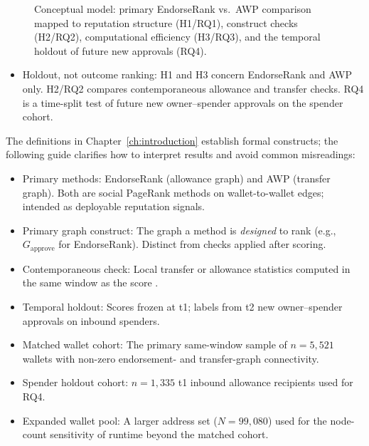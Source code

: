 \begin{figure}[htbp]
\centering

\caption{Conceptual model: primary EndorseRank vs.\ AWP comparison mapped to reputation structure (H1/RQ1), construct checks (H2/RQ2), computational efficiency (H3/RQ3), and the temporal holdout of future new approvals (RQ4).}
\label{fig:conceptual-model}
\end{figure}

\begin{itemize}
\item Holdout, not outcome ranking: H1 and H3 concern EndorseRank and AWP only. H2/RQ2 compares contemporaneous allowance and transfer checks. RQ4 is a time-split test of future new owner--spender approvals on the spender cohort.
\end{itemize}


The definitions in Chapter~\ref{ch:introduction} establish formal constructs; the following guide clarifies how to interpret results and avoid common misreadings:

\begin{itemize}
\item Primary methods: EndorseRank (allowance graph) and AWP (transfer graph). Both are social PageRank methods on wallet-to-wallet edges; intended as deployable reputation signals.
\item Primary graph construct: The graph a method is \emph{designed} to rank (e.g., $G_{\text{approve}}$ for EndorseRank). Distinct from checks applied after scoring.
\item Contemporaneous check: Local transfer or allowance statistics computed in the same window as the score .
\item Temporal holdout: Scores frozen at t1; labels from t2 new owner--spender approvals on inbound spenders.
\item Matched wallet cohort: The primary same-window sample of $n=5{,}521$ wallets with non-zero endorsement- and transfer-graph connectivity.
\item Spender holdout cohort: $n=1{,}335$ t1 inbound allowance recipients used for RQ4.
\item Expanded wallet pool: A larger address set ($N=99{,}080$) used for the node-count sensitivity of runtime beyond the matched cohort.
\end{itemize}


